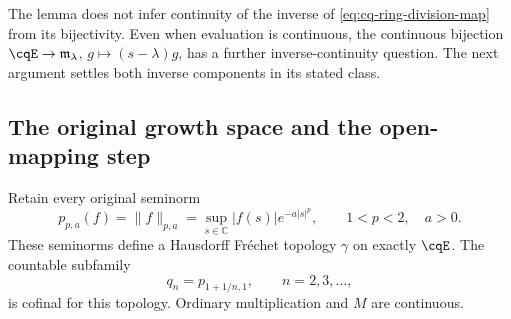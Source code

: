 The lemma does not infer continuity of the inverse of
\eqref{eq:cq-ring-division-map} from its bijectivity.
Even when evaluation is continuous, the continuous bijection
$\cqE\to\mathfrak m_\lambda$, $g\mapsto(s-\lambda)g$,
has a further inverse-continuity question. The next argument
settles both inverse components in its stated class.

\subsection{The original growth space and the open-mapping step}

\begin{cqlemma}
\label{thm:cq-ring-gamma-Frechet}
Retain every original seminorm
\[
 p_{p,a}(f)=\|f\|_{p,a}
   =\sup_{s\in\mathbb C}|f(s)|e^{-a|s|^p},
 \qquad 1<p<2,\quad a>0.
\]
These seminorms define a Hausdorff Fr\'echet topology $\gamma$
on exactly $\cqE$. The countable subfamily
\begin{equation}
 q_n=p_{1+1/n,1},\qquad n=2,3,\ldots,
 \label{eq:cq-ring-countable-growth}
\end{equation}
is cofinal for this topology. Ordinary multiplication and $M$
are continuous.
\end{cqlemma}
